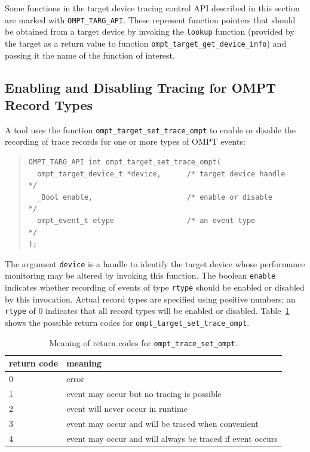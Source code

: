 \documentclass{article}
\begin{document}
Some functions in the target device tracing control API described in this section are marked with \verb|OMPT_TARG_API|. These represent function pointers that should be obtained from a target device by invoking the \verb|lookup| function (provided by the target  as a return value to function \verb|ompt_target_get_device_info|) and passing it the name of the function of interest.


\subsection{Enabling and Disabling Tracing for OMPT Record Types}
\label{sec:trace-event}
A tool uses the function \verb|ompt_target_set_trace_ompt| to enable or disable the recording of trace records for one or more types of OMPT events:

\begin{quote}
\begin{verbatim}
OMPT_TARG_API int ompt_target_set_trace_ompt(
  ompt_target_device_t *device,      /* target device handle      */
  _Bool enable,                      /* enable or disable         */
  ompt_event_t etype                 /* an event type             */
);
\end{verbatim}
\end{quote}
The argument \verb|device| is a handle to identify the target device whose performance monitoring may be altered by invoking this function. 
The boolean \verb|enable| indicates whether recording of events of type \verb|rtype| should be enabled or disabled by this invocation.
Actual record types are specified using positive numbers; an \verb|rtype| of 0 indicates that all record types will be enabled or disabled.
Table~\ref{table:record_set} shows the possible return codes for \verb|ompt_target_set_trace_ompt|.
\begin{table}
\centering
\begin{tabular}{|l|l|}
\hline
return code & meaning \\\hline
0 & error\\\hline
1 & event may occur but no tracing is possible\\\hline
2 & event will never occur in runtime\\\hline
3 & event may occur and will be traced  when convenient\\\hline
4 & event may occur and will always be traced if event occurs\\\hline
\end{tabular}
\caption{Meaning of return codes for {\tt ompt\_trace\_set\_ompt}.}
\label{table:record_set}
\end{table}
\end{document}

